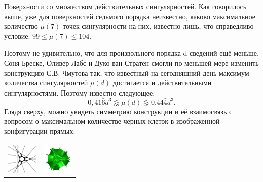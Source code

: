 \begin{surferPage}{Поверхности со множеством действительных сингулярностей.}
    Как говорилось выше, уже для поверхностей седьмого порядка неизвестно, каково максимальное количество $\mu(7)$ точек сингулярности на них, известно лишь, что справедливо условие: $99\le \mu(7) \le 104$. 

Поэтому не удивительно, что для произвольного порядка d сведений ещё меньше. Соня Бреске, Оливер Лабс и Дуко ван Стратен смогли по меньшей мере изменить конструкцию С.В. Чмутова так, что известный на сегодняшний день максимум количества сингулярностей $\mu(d)$ достигается и действительными сингулярностями. Поэтому известно следующее: 
    \[0,41\bar{6}d^3 \lessapprox \mu(d) \lessapprox 0.44\bar{4} d^3.\]
Глядя сверху, можно увидеть симметрию конструкции и её взаимосвязь с вопросом о максимальном количестве черных клеток в изображенной конфигурации прямых:
    \begin{center}
      \begin{tabular}{c@{\qquad}c}
        \includegraphics[height=1.5cm]{./../../common/images/vielesing.pdf}
        &
        \includegraphics[height=1.5cm]{./../../common/images/p9surface_von_oben}
      \end{tabular}
    \end{center}
\end{surferPage}
